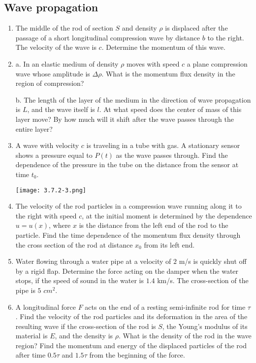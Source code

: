 \documentclass{article}
\begin{document}
\subsection{Wave propagation}

\begin{enumerate}[label=3.7.\arabic*]

\item The middle of the rod of section $S$ and density $\rho$ is displaced after the passage of a short longitudinal compression wave by distance $b$ to the right. The velocity of the wave is $c$. Determine the momentum of this wave.

\item a. In an elastic medium of density $\rho$ moves with speed $c$ a plane compression wave whose amplitude is $\Delta \rho$. What is the momentum flux density in the region of compression? 

b. The length of the layer of the medium in the direction of wave propagation is $L$, and the wave itself is $l$. At what speed does the center of mass of this layer move? By how much will it shift after the wave passes through the entire layer?

\item A wave with velocity $c$ is traveling in a tube with gas. A stationary sensor shows a pressure equal to $P(t)$ as the wave passes through. Find the dependence of the pressure in the tube on the distance from the sensor at time $t_0$.

\begin{center}
    \texttt{[image: 3.7.2-3.png]}
\end{center}

\item The velocity of the rod particles in a compression wave running along it to the right with speed $c$, at the initial moment is determined by the dependence $u = u(x)$, where $x$ is the distance from the left end of the rod to the particle. Find the time dependence of the momentum flux density through the cross section of the rod at distance $x_0$ from its left end.

\item Water flowing through a water pipe at a velocity of $2$ m/s is quickly shut off by a rigid flap. Determine the force acting on the damper when the water stops, if the speed of sound in the water is $1.4 $ km/s. The cross-section of the pipe is $5$ $cm^2$.

\item A longitudinal force $F$ acts on the end of a resting semi-infinite rod for time $\tau$. Find the velocity of the rod particles and its deformation in the area of the resulting wave if the cross-section of the rod is $S$, the Young's modulus of its material is $E$, and the density is $\rho$. What is the density of the rod in the wave region? Find the momentum and energy of the displaced particles of the rod after time $0.5 \tau$ and $1.5 \tau$ from the beginning of the force.


\end{enumerate}
\end{document}
